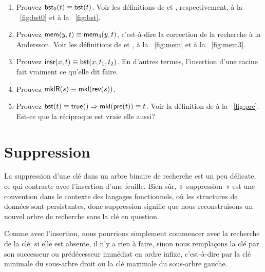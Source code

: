 \begin{enumerate}

  \item Prouvez \(\textsf{bst}_0(t) \equiv \textsf{bst}(t)\). Voir les
  définitions de  et
  , respectivement, à la
  \fig~\vref{fig:bst0} et à la \fig~\vref{fig:bst}.

  \item Prouvez \(\textsf{mem}(y,t) \equiv \textsf{mem}_3(y,t)\), c'est-à-dire
  la correction de la recherche à la Andersson. Voir les définitions
  de  et
  , à la
  \fig~\vref{fig:mem} et à la \fig~\vref{fig:mem3}.

  \item Prouvez \(\textsf{insr}(x,t) \equiv \textsf{bst}(x,t_1,t_2)\).
   En d'autres termes, l'insertion d'une
  racine fait vraiment ce qu'elle dit faire.

  \item Prouvez \(\textsf{mklR}(s) \equiv \textsf{mkl}(\textsf{rev}(s))\).
   

  \item Prouvez \(\textsf{bst}(t) \equiv \textsf{true}() \Rightarrow
  \textsf{mkl}(\textsf{pre}(t)) \equiv t\). Voir la définition de
    à la \fig~\vref{fig:pre}. Est-ce
  que la réciproque est vraie elle aussi?

\end{enumerate}

\section{Suppression}

La suppression d'une clé dans un arbre binaire de recherche est un peu
délicate, ce qui contraste avec l'insertion d'une feuille. Bien sûr,
«~suppression~» est une convention dans le contexte des langages
fonctionnels, où les structures de données sont persistantes, donc
suppression signifie que nous reconstruisons un nouvel arbre de
recherche sans la clé en question.

Comme avec l'insertion, nous pourrions simplement commencer avec la
recherche de la clé: si elle est absente, il n'y a rien à faire, sinon
nous remplaçons la clé par son successeur ou prédécesseur immédiat en
ordre infixe, c'est-à-dire par la clé minimale du sous-arbre droit ou
la clé maximale du sous-arbre gauche.

